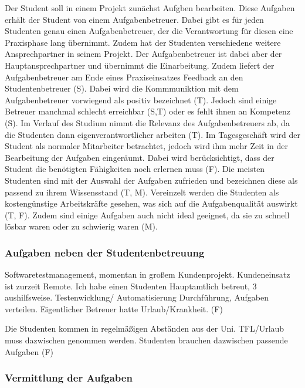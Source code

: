 \documentclass[
  12pt,
  ngerman,
  a4paper,
]{article}
\begin{document}
Der Student soll in einem Projekt zunächst Aufgben bearbeiten. Diese
Aufgaben erhält der Student von einem Aufgabenbetreuer. Dabei gibt es
für jeden Studenten genau einen Aufgabenbetreuer, der die Verantwortung
für diesen eine Praxisphase lang übernimmt. Zudem hat der Studenten
verschiedene weitere Ansprechpartner in seinem Projekt. Der
Aufgabenbetreuer ist dabei aber der Hauptansprechpartner und übernimmt
die Einarbeitung. Zudem liefert der Aufgabenbetreuer am Ende eines
Praxiseinsatzes Feedback an den Studentenbetreuer (S). Dabei wird die
Kommmuniktion mit dem Aufgabenbetreuer vorwiegend als positiv bezeichnet
(T). Jedoch sind einige Betreuer manchmal schlecht erreichbar (S,T) oder
es fehlt ihnen an Kompetenz (S). Im Verlauf des Studium nimmt die
Relevanz des Aufgabenbetreuers ab, da die Studenten dann
eigenverantwortlicher arbeiten (T). Im Tagesgeschäft wird der Student
als normaler Mitarbeiter betrachtet, jedoch wird ihm mehr Zeit in der
Bearbeitung der Aufgaben eingeräumt. Dabei wird berücksichtigt, dass der
Student die benötigten Fähigkeiten noch erlernen muss (F). Die meisten
Studenten sind mit der Auswahl der Aufgaben zufrieden und bezeichnen
diese als passend zu ihrem Wissensstand (T, M). Vereinzelt werden die
Studenten als kostengünstige Arbeitskräfte gesehen, was sich auf die
Aufgabenqualität auswirkt (T, F). Zudem sind einige Aufgaben auch nicht
ideal geeignet, da sie zu schnell lösbar waren oder zu schwierig waren
(M).

\hypertarget{aufgaben-neben-der-studentenbetreuung}{%
\subsubsection{Aufgaben neben der
Studentenbetreuung}\label{aufgaben-neben-der-studentenbetreuung}}

Softwaretestmanagement, momentan in großem Kundenprojekt. Kundeneinsatz
ist zurzeit Remote. Ich habe einen Studenten Hauptamtlich betreut, 3
aushilfsweise. Testenwicklung/ Automatisierung Durchführung, Aufgaben
verteilen. Eigentlicher Betreuer hatte Urlaub/Krankheit. (F)

Die Studenten kommen in regelmäßigen Abständen aus der Uni. TFL/Urlaub
muss dazwischen genommen werden. Studenten brauchen dazwischen passende
Aufgaben (F)

\hypertarget{vermittlung-der-aufgaben}{%
\subsubsection{Vermittlung der
Aufgaben}\label{vermittlung-der-aufgaben}}
\end{document}
